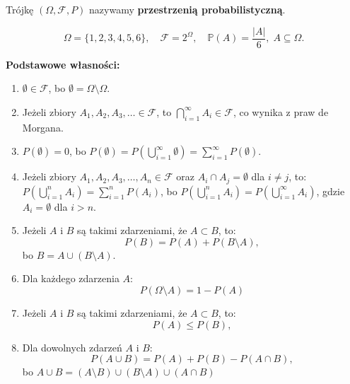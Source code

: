 \documentclass[final,a4paper,openany,12pt]{mwbk}
\begin{document}
\begin{Def}
    Trójkę $(\Omega, \mathcal{F}, P)$ nazywamy \textbf{przestrzenią probabilistyczną}.
\end{Def}

\begin{Prz}
    \[
\Omega = \{1,2,3,4,5,6\},\quad
\mathcal F = 2^{\Omega},\quad
\mathbb P(A) = \frac{|A|}{6},\; A\subseteq\Omega.
\]

\end{Prz}



\vspace{3mm}

\noindent\textbf{Podstawowe własności:}
\begin{enumerate}
    \item $\emptyset \in \mathcal{F}$, bo $\emptyset = \Omega \setminus \Omega$.

    \item Jeżeli zbiory $A_1, A_2, A_3, \dots \in \mathcal{F}$, to $\bigcap_{i=1}^{\infty} A_i \in \mathcal{F}$, co wynika z praw de Morgana.

    \item $P(\emptyset) = 0$, bo $P(\emptyset) = P\left(\bigcup_{i=1}^{\infty} \emptyset\right) = \sum_{i=1}^{\infty} P(\emptyset)$.

    \item Jeżeli zbiory $A_1, A_2, A_3, \dots, A_n \in \mathcal{F}$ oraz $A_i \cap A_j = \emptyset$ dla $i \neq j$, to:
    $P\left(\bigcup_{i=1}^{n} A_i\right) = \sum_{i=1}^{n} P(A_i)$, bo $P\left(\bigcup_{i=1}^{n} A_i\right) = P\left(\bigcup_{i=1}^{\infty} A_i\right)$, gdzie $A_i = \emptyset$ dla $i > n$.

    \item Jeżeli $A$ i $B$ są takimi zdarzeniami, że $A \subset B$, to:
    \[ P(B) = P(A) + P(B \setminus A), \] bo $B = A \cup (B \setminus A)$.

    \item Dla każdego zdarzenia $A$: \[ P(\Omega\setminus A) = 1 - P(A) \]

    \item Jeżeli $A$ i $B$ są takimi zdarzeniami, że $A \subset B$, to:
    \[ P(A) \leq P(B), \]

    \item Dla dowolnych zdarzeń $A$ i $B$:
    \[ P(A \cup B) = P(A) + P(B) - P(A \cap B), \] bo $A \cup B = (A \setminus B) \cup (B \setminus A) \cup (A \cap B)$
\end{enumerate}
\end{document}
